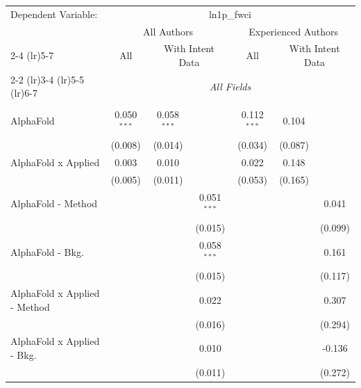 \begingroup
\centering
\begin{tabular}{lcccccc}
   \tabularnewline \midrule \midrule
   Dependent Variable: & \multicolumn{6}{c}{ln1p\_fwci}\\
 & \multicolumn{3}{c}{All Authors} & \multicolumn{3}{c}{Experienced Authors} \\
\cmidrule(lr){2-4} \cmidrule(lr){5-7}
 & \multicolumn{1}{c}{All} & \multicolumn{2}{c}{With Intent Data} & \multicolumn{1}{c}{All} & \multicolumn{2}{c}{With Intent Data} \\
\cmidrule(lr){2-2} \cmidrule(lr){3-4} \cmidrule(lr){5-5} \cmidrule(lr){6-7}
 & \multicolumn{6}{c}{\textit{All Fields}} \\ \\
   AlphaFold                      & 0.050$^{***}$ & 0.058$^{***}$ &               & 0.112$^{***}$ & 0.104   &   \\   
                                  & (0.008)       & (0.014)       &               & (0.034)       & (0.087) &   \\   
   AlphaFold x Applied            & 0.003         & 0.010         &               & 0.022         & 0.148   &   \\   
                                  & (0.005)       & (0.011)       &               & (0.053)       & (0.165) &   \\   
   AlphaFold - Method             &               &               & 0.051$^{***}$ &               &         & 0.041\\   
                                  &               &               & (0.015)       &               &         & (0.099)\\   
   AlphaFold - Bkg.               &               &               & 0.058$^{***}$ &               &         & 0.161\\   
                                  &               &               & (0.015)       &               &         & (0.117)\\   
   AlphaFold x Applied - Method   &               &               & 0.022         &               &         & 0.307\\   
                                  &               &               & (0.016)       &               &         & (0.294)\\   
   AlphaFold x Applied - Bkg.     &               &               & 0.010         &               &         & -0.136\\   
                                  &               &               & (0.011)       &               &         & (0.272)\\   

\end{tabular}
